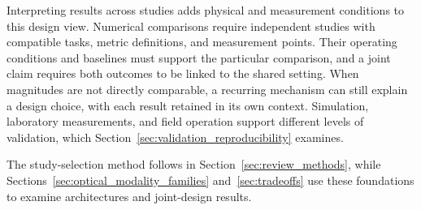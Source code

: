 Interpreting results across studies adds physical and measurement conditions
to this design view. Numerical comparisons require independent studies with
compatible tasks, metric definitions, and measurement points. Their operating
conditions and baselines must support the particular comparison, and a joint
claim requires both outcomes to be linked to the shared setting.
When magnitudes are not directly comparable, a recurring mechanism can still
explain a design choice, with each result retained in its own context.
Simulation, laboratory measurements, and field operation support different
levels of validation, which Section~\ref{sec:validation_reproducibility}
examines.

The study-selection method follows in
Section~\ref{sec:review_methods}, while
Sections~\ref{sec:optical_modality_families} and~\ref{sec:tradeoffs}
use these foundations to examine architectures and joint-design results.

\FloatBarrier
